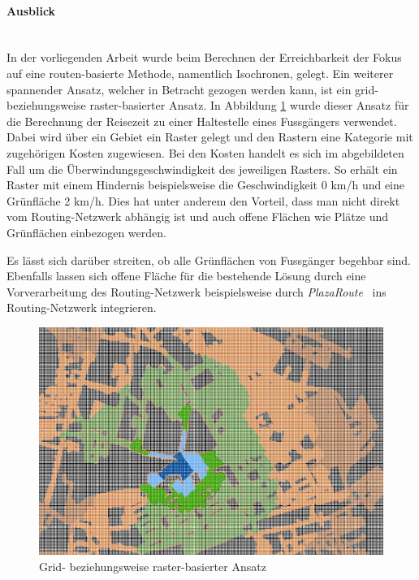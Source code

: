 \paragraph{Ausblick}~\\
In der vorliegenden Arbeit wurde beim Berechnen der Erreichbarkeit der Fokus auf eine routen-basierte Methode, namentlich Isochronen, gelegt.
Ein weiterer spannender Ansatz, welcher in Betracht gezogen werden kann, ist ein grid- beziehungsweise raster-basierter Ansatz.
In Abbildung \ref{fig:mgmt_summary_grid_based_approach} wurde dieser Ansatz für die Berechnung der Reisezeit zu einer Haltestelle eines Fussgängers verwendet.
Dabei wird über ein Gebiet ein Raster gelegt und den Rastern eine Kategorie mit zugehörigen Kosten zugewiesen.
Bei den Kosten handelt es sich im abgebildeten Fall um die Überwindungsgeschwindigkeit des jeweiligen Rasters.
So erhält ein Raster mit einem Hindernis beispielsweise die Geschwindigkeit 0 km/h und eine Grünfläche 2 km/h.
Dies hat unter anderem den Vorteil, dass man nicht direkt vom Routing-Netzwerk abhängig ist und auch offene Flächen wie Plätze und Grünflächen einbezogen werden.

Es lässt sich darüber streiten, ob alle Grünflächen von Fussgänger begehbar sind.
Ebenfalls lassen sich offene Fläche für die bestehende Lösung durch eine Vorverarbeitung des Routing-Netzwerk beispielsweise durch \emph{PlazaRoute}~\cite{plaza_route} ins Routing-Netzwerk integrieren.

\begin{figure}[ht]
    \centering
    \includegraphics[width=0.6\linewidth]{start/img/grid_based_approach.png}
    \caption[Grid- beziehungsweise raster-basierter Ansatz]{Grid- beziehungsweise raster-basierter Ansatz~\cite{pedestrian_accessibility_planning}}
    \label{fig:mgmt_summary_grid_based_approach}
\end{figure}
